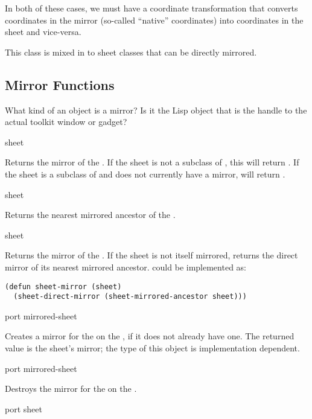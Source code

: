 In both of these cases, we must have a coordinate transformation that converts
coordinates in the mirror (so-called ``native'' coordinates) into coordinates
in the sheet and vice-versa.


This class is mixed in to sheet classes that can be directly mirrored.


\subsection {Mirror Functions}

 {What kind of an object is a mirror?  Is it the Lisp object that is
the handle to the actual toolkit window or gadget?}

 {sheet}

Returns the mirror of the  .  If the sheet is not a
subclass of , this will return .  If the sheet
is a subclass of  and does not currently have a mirror,
 will return .

 {sheet}

Returns the nearest mirrored ancestor of the  .

 {sheet}

Returns the mirror of the  .  If the sheet is not itself
mirrored,  returns the direct mirror of its nearest mirrored
ancestor.   could be implemented as:

\begin{verbatim}
(defun sheet-mirror (sheet)
  (sheet-direct-mirror (sheet-mirrored-ancestor sheet)))
\end{verbatim}

 {port mirrored-sheet}

Creates a mirror for the   on the 
, if it does not already have one.  The returned value is the sheet's
mirror; the type of this object is implementation dependent.

 {port mirrored-sheet}

Destroys the mirror for the   on the 
.

 {port sheet}

